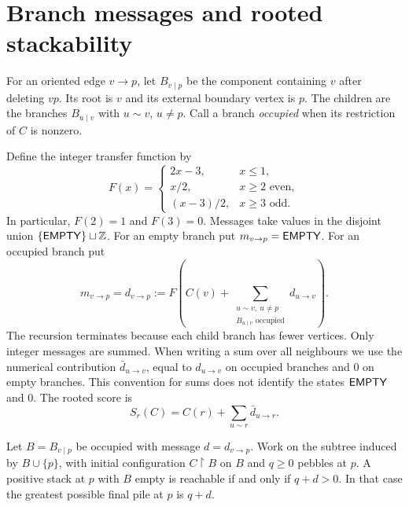 \section{Branch messages and rooted stackability}\label{sec:messages}
For an oriented edge $v\to p$, let $B_{v\mid p}$ be the component
containing $v$ after deleting $vp$. Its root is $v$ and its external boundary
vertex is $p$. The children are the branches $B_{u\mid v}$ with
$u\sim v$, $u\ne p$. Call a branch \emph{occupied} when its restriction of
$C$ is nonzero.

Define the integer transfer function by
\begin{equation}\label{eq:transfer}
 F(x)=\begin{cases}
 2x-3,&x\le1,\\
 x/2,&x\ge2\text{ even},\\
 (x-3)/2,&x\ge3\text{ odd}.
 \end{cases}
\end{equation}
In particular, $F(2)=1$ and $F(3)=0$.
Messages take values in the disjoint union $\{\mathsf{EMPTY}\}\sqcup\mathbb Z$.
For an empty branch put $m_{v\to p}=\mathsf{EMPTY}$. For an occupied branch put
\begin{equation}\label{eq:message}
 m_{v\to p}=d_{v\to p}:=
 F\left(C(v)+\sum_{\substack{u\sim v,\ u\ne p\\B_{u\mid v}\text{ occupied}}}
                          d_{u\to v}\right).
\end{equation}
The recursion terminates because each child branch has fewer vertices.
Only integer messages are summed. When writing a sum over all neighbours
we use the numerical contribution $\bar d_{u\to v}$, equal to
$d_{u\to v}$ on occupied branches and $0$ on empty branches. This
convention for sums does not identify the states $\mathsf{EMPTY}$ and $0$.
The rooted score is
\begin{equation}\label{eq:score}
 S_r(C)=C(r)+\sum_{u\sim r}\bar d_{u\to r}.
\end{equation}

\begin{theorem}\label{thm:boundary}
Let $B=B_{v\mid p}$ be occupied with message $d=d_{v\to p}$.
Work on the subtree induced by $B\cup\{p\}$, with initial configuration
$C\restriction B$ on $B$ and $q\ge0$ pebbles at $p$.
A positive stack at $p$ with $B$ empty is reachable if and only if
$q+d>0$. In that case the greatest possible final pile at $p$ is $q+d$.
\end{theorem}

